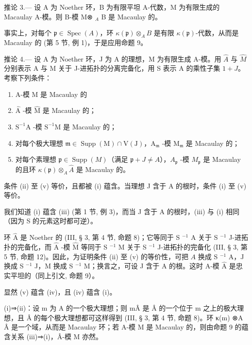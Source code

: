 推论 3.--- 设 A 为 Noether 环，B 为有限平坦 A-代数，M 为有限生成的 Macaulay A-模。则 B-模 M⊗ \(_{A}\) B 是 Macaulay 的。

事实上，对每个 \(\mathfrak{p} \in \operatorname{Spec}(A)\)，环 \(\kappa(\mathfrak{p}) \otimes_{A} B\) 是有限 \(\kappa(\mathfrak{p})\)-代数，从而是 Macaulay 的 (第 5 节, 例 1)，于是应用命题 9。

推论 4.--- 设 A 为 Noether 环，J 为 A 的理想，M 为有限生成 A-模。用 \(\hat{A}\) 与 \(\hat{M}\) 分别表示 A 与 M 关于 J-进拓扑的分离完备化，用 S 表示 A 的乘性子集 \(1 + J\)。考察下列条件：

\begin{enumerate}
\def\labelenumi{(\roman{enumi})}
\item
  A-模 M 是 Macaulay 的
\item
  \(\widehat{\mathrm{A}}\) -模 \(\widehat{\mathrm{M}}\) 是 Macaulay 的；
\item
  \(\mathrm{S}^{-1}\mathrm{A}\) -模 \(\mathrm{S}^{-1}\mathrm{M}\) 是 Macaulay 的；
\item
  对每个极大理想 \(\mathfrak{m} \in \operatorname{Supp}(\mathrm{M}) \cap \mathrm{V}(\mathrm{J})\)，\(\mathrm{A}_{\mathfrak{m}}\) -模 \(\mathrm{M}_{\mathfrak{m}}\) 是 Macaulay 的；
\item
  对每个素理想 \(\mathfrak{p} \in \operatorname{Supp}(M)\)（满足 \(\mathfrak{p} + J \neq A\)），\(A_{\mathfrak{p}}\) -模 \(M_{\mathfrak{p}}\) 是 Macaulay 的且环 \(\kappa(\mathfrak{p}) \otimes_{A} \widehat{A}\) 是 Macaulay 的。
\end{enumerate}

条件 (ii) 至 (v) 等价，且都被 (i) 蕴含。当理想 J 含于 A 的根时，条件 (i) 至 (v) 等价。

我们知道 (i) 蕴含 (iii) (第 1 节, 例 3)，而当 J 含于 A 的根时，(iii) 与 (i) 相同（因为 S 的元素这时都可逆）。

环 \(\widehat{\mathrm{A}}\) 是 Noether 的 (III, § 3, 第 4 节, 命题 8)；它等同于 S \(^{-1}\) A 关于 S \(^{-1}\) J-进拓扑的完备化，而 \(\widehat{\mathrm{A}}\) -模 \(\widehat{\mathrm{M}}\) 等同于 S \(^{-1}\) M 关于 S \(^{-1}\) J-进拓扑的完备化 (III, § 3, 第 5 节, 命题 12)。因此，为证明条件 (ii) 至 (v) 的等价性，可把 \(A\) 换成 S \(^{-1}\) A，J 换成 S \(^{-1}\) J，M 换成 S \(^{-1}\) M；换言之，可设 J 含于 A 的根。这时 A-模 \(\widehat{\mathrm{A}}\) 是忠实平坦的（同上引文, 命题 9）。

显然 (v) 蕴含 (iv)，且 (iv) 蕴含 (i)。

(i)⇒(ii)：设 m 为 A 的一个极大理想；则 mÂ 是 Â 的一个位于 m 之上的极大理想，且 Â 的每个极大理想都可这样得到 (III, § 3, 第 4 节, 命题 8)。环 κ(m) ⊗A Â 是一个域，从而是 Macaulay 环；若 A-模 M 是 Macaulay 的，则由命题 9 的蕴含关系 (iii)⇒(i)，Â-模 M 亦然。

